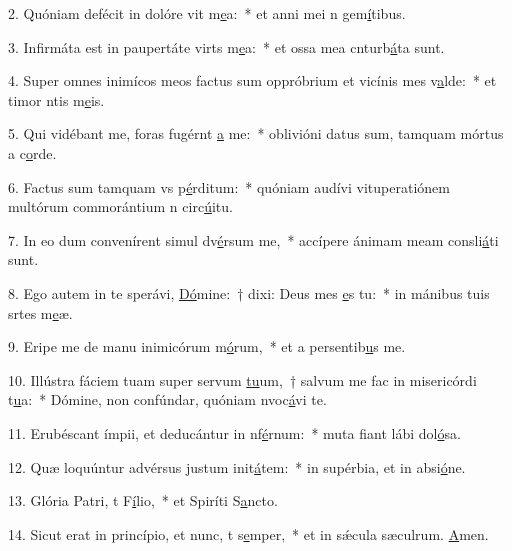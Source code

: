 2. Quóniam defécit in dolóre vit m\uline{e}a:~* et anni mei n gem\uline{í}tibus.\par 
3. Infirmáta est in paupertáte virts m\uline{e}a:~* et ossa mea cnturb\uline{á}ta sunt.\par 
4. Super omnes inimícos meos factus sum oppróbrium et vicínis mes v\uline{a}lde:~* et timor ntis m\uline{e}is.\par 
5. Qui vidébant me, foras fugérnt \uline{a} me:~* oblivióni datus sum, tamquam mórtus a c\uline{o}rde.\par 
6. Factus sum tamquam vs p\uline{é}rditum:~* quóniam audívi vituperatiónem multórum commorántium n circ\uline{ú}itu.\par 
7. In eo dum convenírent simul dv\uline{é}rsum me,~* accípere ánimam meam consli\uline{á}ti sunt.\par 
8. Ego autem in te sperávi, \uline{Dó}mine:~† dixi: Deus mes \uline{e}s tu:~* in mánibus tuis srtes m\uline{e}æ.\par 
9. Eripe me de manu inimicórum m\uline{ó}rum,~* et a persentib\uline{u}s me.\par 
10. Illústra fáciem tuam super servum \uline{tu}um,~† salvum me fac in misericórdi t\uline{u}a:~* Dómine, non confúndar, quóniam nvoc\uline{á}vi te.\par 
11. Erubéscant ímpii, et deducántur in nf\uline{é}rnum:~* muta fiant lábi dol\uline{ó}sa.\par 
12. Quæ loquúntur advérsus justum init\uline{á}tem:~* in supérbia, et in absi\uline{ó}ne.\par 
13. Glória Patri, t F\uline{í}lio,~* et Spiríti S\uline{a}ncto.\par 
14. Sicut erat in princípio, et nunc, t s\uline{e}mper,~* et in sǽcula sæculrum. \uline{A}men.\par 
